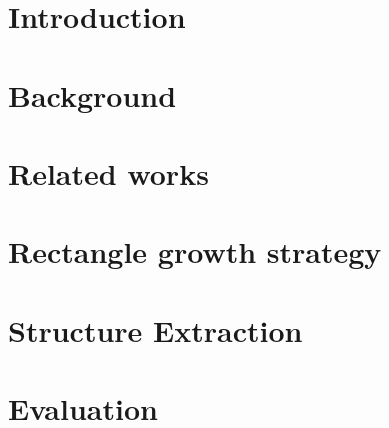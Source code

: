 \documentclass{report}
\begin{document}
\chapter{Introduction}


\chapter{Background}


\chapter{Related works}


\chapter{Rectangle growth strategy}


\chapter{Structure Extraction}


\chapter{Evaluation}



\nocite{*} %


\end{document}

